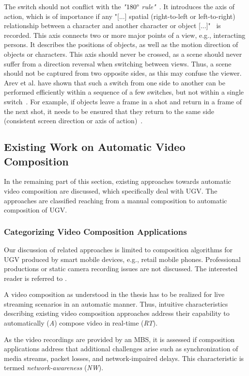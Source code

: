 The switch should not conflict with the \emph{"$180\degree$ rule"}~\cite{Bowen2013b}.
It introduces the axis of action, which is of importance if any "[...] spatial (right-to-left or left-to-right) relationship between a character and another character or object [...]"~\cite[8]{Proferes2005} is recorded. 
This axis connects two or more major points of a view, e.g., interacting persons.
It describes the positions of objects, as well as the motion direction of objects or characters.
This axis should never be crossed, as a scene should never suffer from a direction reversal when switching between views.
Thus, a scene should not be captured from two opposite sides, as this may confuse the viewer.
Arev et al. have shown that such a switch from one side to another can be performed efficiently within a sequence of a few switches, but not within a single switch~\cite{Arev2014}.
For example, if objects leave a frame in a shot and return in a frame of the next shot, it needs to be ensured that they return to the same side (consistent screen direction or axis of action)~\cite{Proferes2005}.
\subsection{Existing Work on Automatic Video Composition}
In the remaining part of this section, existing approaches towards automatic video composition are discussed, which specifically deal with \ac{UGV}.
The approaches are classified reaching from a manual composition to automatic composition of \ac{UGV}.
\subsubsection{Categorizing Video Composition Applications}
Our discussion of related approaches is limited to composition algorithms for \ac{UGV} produced by smart mobile devices, e.g., retail mobile phones.
Professional productions or static camera recording issues are not discussed. 
The interested reader is referred to \cite{Lampi2010,Pozzer2009}.

A video composition as understood in the thesis has to be realized for live streaming scenarios in an automatic manner.
Thus, intuitive characteristics describing  existing video composition approaches address their capability to automatically (\emph{A}) compose video in real-time (\emph{RT}).

As the video recordings are provided by an \ac{MBS}, it is assessed if composition applications address that additional challenges arise such as synchronization of media streams, packet losses, and network-impaired delays.
This characteristic is termed \emph{network-awareness} (\emph{NW}).

